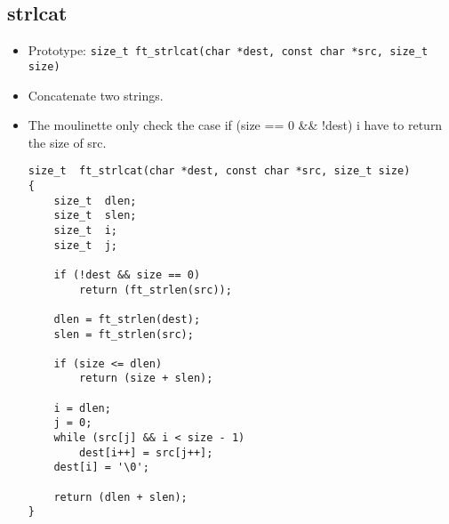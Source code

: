 \documentclass{article}
\begin{document}
	\subsection{strlcat}
		\begin{itemize}[label=$\rightarrow$]
			\item Prototype: \texttt{size\_t  ft\_strlcat(char *dest, const char *src, size\_t size) }
			\item Concatenate two strings.
			\item The moulinette only check the case if (size == 0 \&\& !dest) i have to return the size of src.
			\begin{verbatim}
size_t  ft_strlcat(char *dest, const char *src, size_t size)                    
{                                                                               
    size_t  dlen;                                                               
    size_t  slen;                                                               
    size_t  i;                                                                  
    size_t  j;                                                                  
                                                                                
    if (!dest && size == 0)                                                     
        return (ft_strlen(src));                                                
                                                                                
    dlen = ft_strlen(dest);                                                     
    slen = ft_strlen(src);                                                      
                                                                                
    if (size <= dlen)                                                           
        return (size + slen);                                                   
                                                                                
    i = dlen;                                                                   
    j = 0;                                                                      
    while (src[j] && i < size - 1)                                              
        dest[i++] = src[j++];                                                   
    dest[i] = '\0';                                                             
                                                                                
    return (dlen + slen);                                                       
} 
			\end{verbatim}
		\end{itemize}
	
\end{document}
